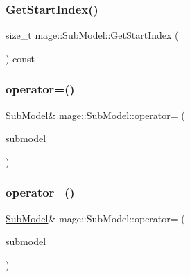 \subsubsection{\texorpdfstring{Get\+Start\+Index()}{GetStartIndex()}}
{\footnotesize\ttfamily size\+\_\+t mage\+::\+Sub\+Model\+::\+Get\+Start\+Index (\begin{DoxyParamCaption}{ }\end{DoxyParamCaption}) const}

\hypertarget{classmage_1_1_sub_model_aafc8b4ba509ec78ea36719e98b1a0c99}{}\label{classmage_1_1_sub_model_aafc8b4ba509ec78ea36719e98b1a0c99} 
\subsubsection{\texorpdfstring{operator=()}{operator=()}\hspace{0.1cm}{\footnotesize\ttfamily [1/2]}}
{\footnotesize\ttfamily \hyperlink{classmage_1_1_sub_model}{Sub\+Model}\& mage\+::\+Sub\+Model\+::operator= (\begin{DoxyParamCaption}\item[{const \hyperlink{classmage_1_1_sub_model}{Sub\+Model} \&}]{submodel }\end{DoxyParamCaption})\hspace{0.3cm}{\ttfamily [delete]}}

\hypertarget{classmage_1_1_sub_model_a616b8007e767deebc248485fb8d26773}{}\label{classmage_1_1_sub_model_a616b8007e767deebc248485fb8d26773} 
\subsubsection{\texorpdfstring{operator=()}{operator=()}\hspace{0.1cm}{\footnotesize\ttfamily [2/2]}}
{\footnotesize\ttfamily \hyperlink{classmage_1_1_sub_model}{Sub\+Model}\& mage\+::\+Sub\+Model\+::operator= (\begin{DoxyParamCaption}\item[{\hyperlink{classmage_1_1_sub_model}{Sub\+Model} \&\&}]{submodel }\end{DoxyParamCaption})\hspace{0.3cm}{\ttfamily [delete]}}



